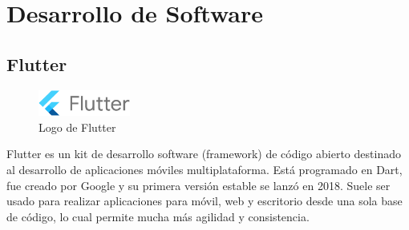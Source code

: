 \begin{figure}[H]
    \centering
    \hspace{3em}
\end{figure}

\newpage



\section{Desarrollo de Software}

\subsection{Flutter}
\begin{figure}
\vspace*{-0.4cm}
\centering
\includegraphics[width=0.27\textwidth]{imagenes/c2/flutter.png}

\caption{Logo de Flutter}
\end{figure}Flutter es un kit de desarrollo software (framework) de código abierto destinado al desarrollo de aplicaciones móviles multiplataforma. Está programado en Dart, fue creado por Google y su primera versión estable se lanzó en 2018.
Suele ser usado para realizar aplicaciones para móvil, web y escritorio desde una sola base de código, lo cual permite mucha más agilidad y consistencia.

